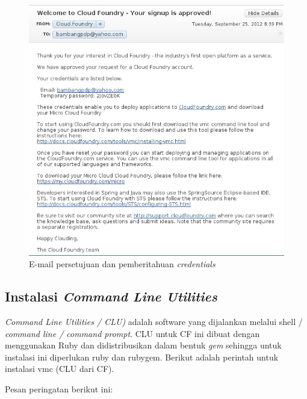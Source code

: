   \begin{figure}[t]
    \begin{center}
      \includegraphics[scale=0.5]{images/cf-signup-approved.jpg}
    \end{center}
    \caption{E-mail persetujuan dan pemberitahuan \textit{credentials}}
    \label{fig:cfsignupapproved}
  \end{figure}

\subsection{Instalasi \textit{Command Line Utilities}}

\textit{Command Line Utilities / CLU)} adalah software yang dijalankan melalui shell / \textit{command line / command prompt}. CLU untuk CF ini dibuat dengan menggunakan Ruby dan didistribusikan dalam bentuk \textit{gem} sehingga untuk instalasi ini diperlukan ruby dan rubygem. Berikut adalah perintah untuk instalasi vmc (CLU dari CF).

\lstset{language=bash,caption=Instalasi vmc}


Pesan peringatan berikut ini:

\lstset{language=bash,caption=Peringatan setting PATH untuk vmc}


